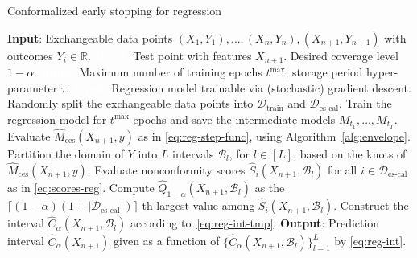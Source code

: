 \begin{algorithm}[H]
    \caption{Conformalized early stopping for regression}
    \label{alg:reg}
    \begin{algorithmic}[1]
        \STATE \textbf{Input}: Exchangeable data points $(X_{1},Y_{1}), \ldots, (X_{n},Y_{n}), (X_{n+1},Y_{n+1})$ with outcomes $Y_i \in \mathbb{R}$.
        \STATE \textcolor{white}{\textbf{Input}:} Test point with features $X_{n+1}$. Desired coverage level $1-\alpha$.
        \STATE \textcolor{white}{\textbf{Input}:} Maximum number of training epochs $t^{\max}$; storage period hyper-parameter $\tau$.
        \STATE \textcolor{white}{\textbf{Input}:} Regression model trainable via (stochastic) gradient descent.
        \STATE Randomly split the exchangeable data points into $\mathcal{D}_{\text{train}}$ and $\mathcal{D}_{\text{es-cal}}$.
        \STATE Train the regression model for $t^{\text{max}}$ epochs and save the intermediate models $M_{t_1} , \dots, M_{t_T}$.
        \STATE Evaluate $\hat{M}_{\text{ces}}(X_{n+1},y)$ as in \eqref{eq:reg-step-func}, using Algorithm~\ref{alg:envelope}.
        \STATE Partition the domain of $Y$ into $L$ intervals $\mathcal{B}_l$, for $l \in [L]$, based on the knots of $\hat{M}_{\text{ces}}(X_{n+1},y)$.
        \STATE Evaluate nonconformity scores $\hat{S}_i(X_{n+1},\mathcal{B}_l)$ for all $i \in \mathcal{D}_{\text{es-cal}}$ as in \eqref{eq:scores-reg}.
        \STATE Compute $\hat{Q}_{1-\alpha}(X_{n+1},\mathcal{B}_l)$ as the $\lceil (1-\alpha)(1+|\mathcal{D}_{\text{es-cal}}|) \rceil$-th largest value among $\hat{S}_i(X_{n+1},\mathcal{B}_l)$.
 \STATE Construct the interval $\hat{C}_{\alpha}(X_{n+1}, \mathcal{B}_l)$ according to~\eqref{eq:reg-int-tmp}.
        \ENDFOR
        \STATE \textbf{Output}: Prediction interval $\hat{C}_{\alpha}(X_{n+1})$ given as a function of $\{\hat{C}_{\alpha}(X_{n+1}, \mathcal{B}_l)\}_{l=1}^{L}$ by \eqref{eq:reg-int}.
    \end{algorithmic}
\end{algorithm}


